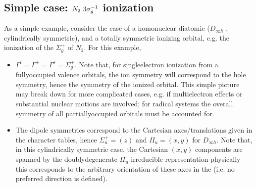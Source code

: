 \documentclass[letterpaper,table,10pt,english]{jupyterBook}
\begin{document}
\subsection{Simple case: \protect\(N_2~3\sigma_g^{-1}\protect\) ionization}
\label{\detokenize{part2/sym-fitting-intro_240723:simple-case-n-2-3-sigma-g-1-ionization}}
\sphinxAtStartPar
As a simple example, consider the case of a homonuclear diatomic (\(D_{\infty h}\) {\hyperref[\detokenize{backmatter/glossary:term-PG}]{}}, cylindrically symmetric), and a totally symmetric ionizing orbital, e.g. the ionization of the \(\Sigma_{g}^{+}\) {\hyperref[\detokenize{backmatter/glossary:term-HOMO}]{}} of \(N_2\). For this example,
\begin{itemize}
\item {} 
\sphinxAtStartPar
\(\Gamma^{i} = \Gamma^{+} = \Gamma^{s} = \Sigma_{g}^{+}\). Note that, for single\sphinxhyphen{}electron ionization from a fully\sphinxhyphen{}occupied valence orbitals, the ion symmetry will correspond to the hole symmetry, hence the symmetry of the ionized orbital. This simple picture may break down for more complicated cases, e.g. if multi\sphinxhyphen{}electron effects or substantial nuclear motions are involved; for radical systems the overall symmetry of all partially\sphinxhyphen{}occupied orbitals must be accounted for.

\item {} 
\sphinxAtStartPar
The dipole symmetries correspond to the Cartesian axes/translations given in the character tables, hence \(\Sigma_{u}^{+} = (z)\) and \(\Pi_{u} = (x,y)\) for \(D_{\infty h}\). Note that, in this cylindrically symmetric case, the Cartesian \((x,y)\) components are spanned by the doubly\sphinxhyphen{}degenerate \(\Pi_{u}\) irreducible representation \sphinxhyphen{} physically this corresponds to the arbitrary orientation of these axes in the {\hyperref[\detokenize{backmatter/glossary:term-MF}]{}} (i.e. no preferred direction is defined).

\end{itemize}
\end{document}
